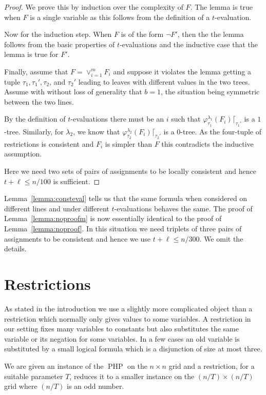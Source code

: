 \documentclass{article}\usepackage[a4paper,margin=20mm]{geometry}
\DeclareMathOperator{\PHP}{PHP}
\begin{document}
\begin{proof}
We prove this by induction over the complexity of $F$.
The lemma is true when $F$ is a single variable
as this follows from the definition of a $t$-evaluation.

Now for the induction step.  When $F$ is of
the form $\neg F'$, then the the
lemma follows from the basic properties of
$t$-evaluations and the inductive case that
the lemma is true for $F'$.

Finally, assume that $F=\lor_{i=1}^m F_i$ and suppose
it violates the lemma getting a tuple $\tau_1, \tau_1',
\tau_2$, and $\tau_2'$ leading to leaves with
different values in the two trees.  Assume with
without loss of generality that $b=1$, the situation
being symmetric between the two lines.

By the definition of $t$-evaluations there
must be an $i$ such that 
$\varphi_{\tau_1}^{\lambda_1} (F_i) \lceil_{\tau_1'}$
is a $1$-tree.  Similarly, for
$\lambda_2$, we know that
$\varphi_{\tau_2}^{\lambda_2} (F_i) \lceil_{\tau_2'}$
is a $0$-tree.  As the four-tuple of restrictions is
consistent and $F_i$ is simpler than $F$ this
contradicts the inductive assumption.

Here we need two sets of pairs of assignments to be
locally consistent and hence $t+ \ell \leq n/100$
is sufficient.
\end{proof}

Lemma~\ref{lemma:consteval} tells us that
the same formula when considered on different
lines and under different $t$-evaluations
behaves the same.  The proof of Lemma~\ref{lemma:noproofm}
is now essentially identical to the
proof of Lemma~\ref{lemma:noproof}.  In this situation
we need triplets of three pairs of assignments to be
consistent and hence we use $t + \ell \leq n/300$.
We omit the details.

\section{Restrictions}\label{sec:restrictions}

As stated in the introduction we use a slightly more complicated object than a restriction
which normally only gives values to some variables.
A restriction in our setting fixes many variables to constants but
also substitutes the same variable or its negation for
some variables.  In a few cases an old variable is substituted
by a small logical formula which is a disjunction of
size at most three.

We are given an instance of the $\PHP$ on the $n\times n$ grid
and a restriction, for a suitable parameter $T$, reduces it to a smaller
instance on the $(n/T) \times (n/T)$ grid where $(n/T)$ is an odd number.
\end{document}
